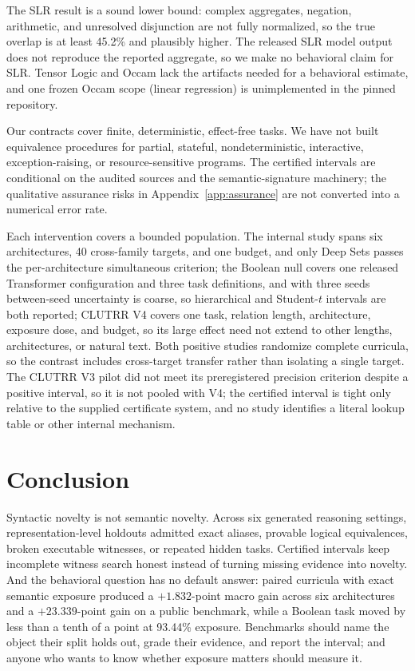 \documentclass[twoside,11pt]{article}
\begin{document}
The SLR result is a sound lower bound: complex aggregates, negation,
arithmetic, and unresolved disjunction are not fully normalized, so the
true overlap is at least 45.2\% and plausibly higher.  The released SLR
model output does not reproduce the reported aggregate, so we make no
behavioral claim for SLR.  Tensor Logic and Occam lack the artifacts needed
for a behavioral estimate, and one frozen Occam scope (linear regression)
is unimplemented in the pinned repository.

Our contracts cover finite, deterministic, effect-free tasks.  We have not
built equivalence procedures for partial, stateful, nondeterministic,
interactive, exception-raising, or resource-sensitive programs.  The
certified intervals are conditional on the audited sources and the
semantic-signature machinery; the qualitative assurance risks in
Appendix~\ref{app:assurance} are not converted into a numerical error rate.

Each intervention covers a bounded population.  The internal study spans six
architectures, 40 cross-family targets, and one budget, and only Deep Sets
passes the per-architecture simultaneous criterion; the Boolean null covers
one released Transformer configuration and three task definitions, and with
three seeds between-seed uncertainty is coarse, so hierarchical and
Student-$t$ intervals are both reported; CLUTRR V4
covers one task, relation length, architecture, exposure dose, and budget, so
its large effect need not extend to other lengths, architectures, or natural
text.  Both positive studies randomize complete curricula, so the contrast
includes cross-target transfer rather than isolating a single target.  The
CLUTRR V3 pilot did not meet its preregistered precision criterion despite a
positive interval, so it is not pooled with V4; the certified interval is
tight only relative to the supplied certificate system, and no study
identifies a literal lookup table or other internal mechanism.

\section{Conclusion}
\label{sec:conclusion}

Syntactic novelty is not semantic novelty.  Across six generated reasoning
settings, representation-level holdouts admitted exact aliases, provable
logical equivalences, broken executable witnesses, or repeated hidden
tasks.  Certified intervals keep incomplete witness search honest instead
of turning missing evidence into novelty.  And the behavioral question has
no default answer: paired curricula with exact semantic exposure produced a
$+1.832$-point macro gain across six architectures and a $+23.339$-point
gain on a public benchmark, while a Boolean task moved by less than a tenth
of a point at 93.44\% exposure.  Benchmarks should name the object their
split holds out, grade their evidence, and report the interval; and anyone
who wants to know whether exposure matters should measure it.
\end{document}
